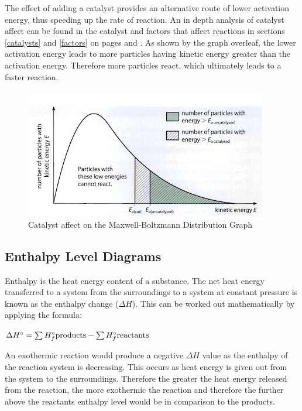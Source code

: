 The effect of adding a catalyst provides an alternative route of lower activation energy, thus speeding up the rate of reaction. An in depth analysis of catalyst affect can be found in the catalyst and factors that affect reactions in sections \ref{catalysts} and \ref{factors} on pages \pageref{catalysts} and \pageref{factors}. As shown by the graph overleaf, the lower activation energy leads to more particles having kinetic energy greater than the activation energy. Therefore more particles react, which ultimately leads to a faster reaction.

\begin{figure}[H]
    \includegraphics[width=\textwidth]{./Planning/Images/CatalysedMaxwell.png}
    \caption{Catalyst affect on the Maxwell-Boltzmann Distribution Graph} \label{fig:CatalystMaxwell}
\end{figure}



	\subsection{Enthalpy Level Diagrams}	

Enthalpy is the heat energy content of a substance. The net heat energy transferred to a system from the surroundings to a system at constant pressure is known as the enthalpy change ($\Delta H$). This can be worked out mathematically by applying the formula:

$\Delta H^\circ = \sum {H^\circ _f {\rm{products}}} - \sum {H^\circ _f {\rm{reactants}}}$

An exothermic reaction would produce a negative $\Delta H$ value as the enthalpy of the reaction system is decreasing. This occurs as heat energy is given out from the system to the surroundings. Therefore the greater the heat energy released from the reaction, the more exothermic the reaction and therefore the further above the reactants enthalpy level would be in comparison to the products.

